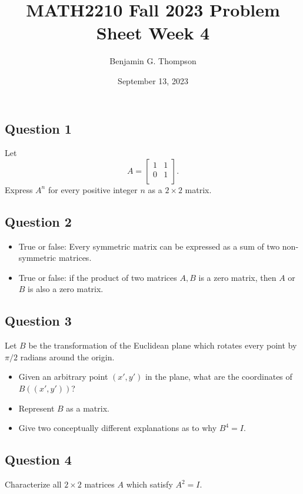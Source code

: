 \documentclass[12pt, a4paper]{article}
\title{MATH2210 Fall 2023 Problem Sheet Week 4}
\author{Benjamin G. Thompson}
\date{September 13, 2023}
\begin{document}
\subsection*{Question 1}
Let 
\[
A = \begin{bmatrix}
  1 & 1 \\
  0 & 1 \\
  \end{bmatrix}.
\]
Express $A^n$ for every positive integer $n$ as a $2 \times 2$ matrix.
\subsection*{Question 2}
\begin{itemize}
  \item True or false: Every symmetric matrix can be expressed as a sum of two non-symmetric matrices.
  \item True or false: if the product of two matrices $A,B$ is a zero matrix, then $A$ or $B$ is also a zero matrix.
\end{itemize}
\subsection*{Question 3}
Let $B$ be the transformation of the Euclidean plane which rotates every point by $\pi/2$ radians around the origin.
\begin{itemize}
  \item Given an arbitrary point $(x',y')$ in the plane, what are the coordinates of $B((x',y'))$?
  \item Represent $B$ as a matrix.
  \item Give two conceptually different explanations as to why $B^4 = I$.
\end{itemize}

\subsection*{Question 4}
Characterize all $2 \times 2$ matrices $A$ which satisfy $A^2 = I$.
\end{document}
